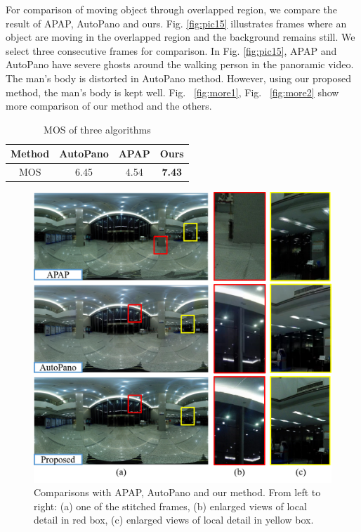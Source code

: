 \documentclass[conference]{IEEEtran}
\begin{document}
For comparison of moving object through overlapped region, we compare the result of APAP, AutoPano and ours. Fig. \ref{fig:pic15} 
illustrates frames where an object are moving in the overlapped region and the background remains still. 
We select three consecutive frames for comparison. In Fig. \ref{fig:pic15}, APAP and AutoPano have severe ghosts around the walking person in the panoramic video. 
The man’s body is distorted in AutoPano method. However, using our proposed method, the man's body is kept well. Fig. ~\ref{fig:more1}, Fig. ~\ref{fig:more2} show more comparison of our method and the others.
\begin{table}[!htpb]
\caption{MOS of three algorithms}
\label{tab1:table1}
\centering
\begin{tabular}{c|c|c|c}
\hline
Method& AutoPano& APAP& Ours\\
\hline
MOS& 6.45& 4.54& \bf{7.43}\\
\hline
\end{tabular}
\end{table}
\begin{figure}[!htpb]
\centering
\includegraphics[scale=0.415]{picture35.png}
\caption{Comparisons with APAP, AutoPano and our method. From left to right: (a) one of the stitched frames, (b) enlarged views of local
detail in red box, (c) enlarged views of local detail in yellow box.}
\label{fig:pic17}
\end{figure}
\end{document}
